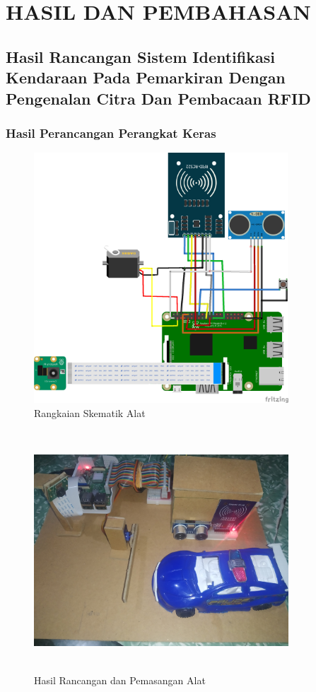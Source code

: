 \chapter{HASIL DAN PEMBAHASAN}

\section{Hasil Rancangan Sistem Identifikasi Kendaraan Pada Pemarkiran Dengan Pengenalan Citra Dan Pembacaan RFID}

\subsection{Hasil Perancangan Perangkat Keras}
\begin{figure} [H]
    \includegraphics[width=0.85\textwidth, center]{images/skematik_full_dan_button_dan_kamera.png}
    \caption{Rangkaian Skematik Alat}
    \label{fig:rangkaianSkematikAlat}
\end{figure}

\begin{figure} [H]
    \includegraphics[height=9cm, width=0.85\textwidth, center]{images/alat-full-mobil.jpg}
    \caption{Hasil Rancangan dan Pemasangan Alat}
    \label{fig:alatfullmobil}
\end{figure}

